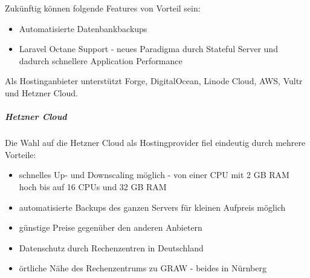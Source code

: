 Zukünftig können folgende Features von Vorteil sein:
\begin{itemize}
    \item Automatisierte Datenbankbackups
    \item Laravel Octane Support - neues Paradigma durch Stateful Server und dadurch schnellere Application Performance\cite{laravel-octane}
\end{itemize}

Als Hostinganbieter unterstützt Forge, DigitalOcean, Linode Cloud, AWS, Vultr und Hetzner Cloud.

\subparagraph{Hetzner Cloud}
Die Wahl auf die Hetzner Cloud als Hostingprovider fiel eindeutig durch mehrere Vorteile:
\begin{itemize}
    \item schnelles Up- und Downscaling möglich - von einer CPU mit 2 GB RAM hoch bis auf 16 CPUs und 32 GB RAM
    \item automatisierte Backups des ganzen Servers für kleinen Aufpreis möglich
    \item günstige Preise gegenüber den anderen Anbietern
    \item Datenschutz durch Rechenzentren in Deutschland
    \item örtliche Nähe des Rechenzentrums zu GRAW - beides in Nürnberg
\end{itemize}
